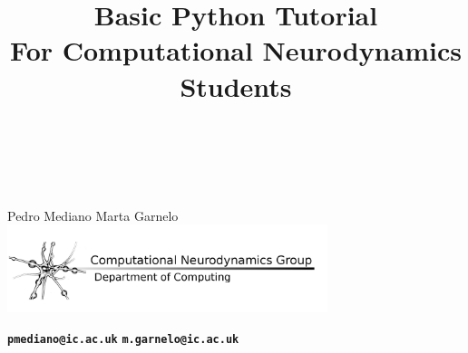 \documentclass[xcolor=x11names, compress,handout]{beamer}
\renewcommand{\(}{\begin{columns}}
\renewcommand{\)}{\end{columns}}
\newcommand{\<}[1]{\begin{column}{#1}}
\renewcommand{\>}{\end{column}}
\newcommand{\ver}[1]{\texttt{\textbf{#1}}}
\begin{document}
\begin{frame}[plain]
  \title{ {\fontsize{14}{1}\selectfont \bfseries Basic Python Tutorial} \\ \vspace{-3pt} {\fontsize{10}{1}\selectfont For Computational Neurodynamics Students} \\  }
\subtitle{ ~ }
\date{}
\vspace{5pt}
\titlepage
\vfill
\begin{center}

% 
% 
% 
% 
% 

  ~ \\
  
  \vfill
  {\large Pedro Mediano \hspace{30pt} Marta Garnelo}\\ \vspace{-8pt}
  {\includegraphics[width=0.7\textwidth]{logo3.png}}\\ \vspace{-10pt}


  \ver{pmediano@ic.ac.uk} \hspace{20pt} \ver{m.garnelo@ic.ac.uk}
\end{center}
\end{frame}


\end{document}
